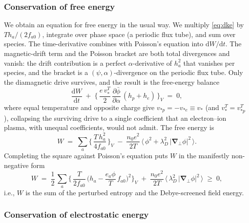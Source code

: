\documentclass{jpp}
\newcommand{\rmd}{\text{d}}
\renewcommand{\vec}[1]{\boldsymbol{#1}}
\newcommand{\vec}[1]{\boldsymbol{#1}}
\newcommand{\grad}{{\vec{\nabla}}}
\newcommand{\lambdaD}{\lambda_D}
\begin{document}
\subsubsection{Conservation of free energy}

We obtain an equation for free energy in the usual way. We multiply \cref{eq:dke} by $Th_a/(2 f_{a0})$, integrate over phase space (a periodic flux tube), and sum over species. The time-derivative combines with Poisson's equation into $\rmd W/\rmd t$. The magnetic-drift term and the Poisson bracket are both total divergences and vanish: the drift contribution is a perfect $\alpha$-derivative of $h_a^2$ that vanishes per species, and the bracket is a $(\psi,\alpha)$-divergence on the periodic flux tube. Only the diamagnetic drive survives, and the result is the free-energy balance
\begin{equation}\label{eq:W_balance}
\frac{\rmd W}{\rmd t} \;+\; \biggl\{\, \frac{e\, v_*^T}{2}\, \frac{\partial \bar{\phi}}{\partial \alpha}\, (h_p + h_e)\, \biggr\}_{\!{\scriptscriptstyle V}} \;=\; 0,
\end{equation}
where equal temperature and opposite charge give $v_{*p} = -v_{*e} \equiv v_*$ (and $v_*^T = v_{*p}^T$), collapsing the surviving drive to a single coefficient that an electron--ion plasma, with unequal coefficients, would not admit. The free energy is
\begin{equation}\label{eq:free_energy}
W \;=\; \sum_a \biggl\{\, \frac{T\, h_a^2}{4 f_{a0}}\, \biggr\}_{\!{\scriptscriptstyle V}} \;-\; \frac{n_0 e^2}{2 T}\, \biggl\langle\, \phi^2 + \lambdaD^2\, |\grad_\perp \phi|^2\, \biggr\rangle .
\end{equation}
Completing the square against Poisson's equation puts $W$ in the manifestly non-negative form
\begin{equation}\label{eq:free_energy_pos}
W \;=\; \frac{1}{2}\, \sum_a \biggl\{\, \frac{T}{2 f_{a0}}\, \biggl(h_a - \frac{e_a \phi}{T}\, f_{a0}\biggr)^{\!2} \biggr\}_{\!{\scriptscriptstyle V}} \;+\; \frac{n_0 e^2}{2 T}\, \biggl\langle\, \lambdaD^2\, |\grad_\perp \phi|^2\, \biggr\rangle \;\geq\; 0,
\end{equation}
i.e., $W$ is the sum of the perturbed entropy and the Debye-screened field energy. 

\subsubsection{Conservation of electrostatic energy}
\end{document}
